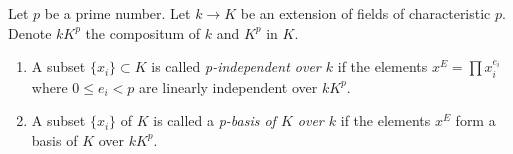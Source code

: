 \begin{definition}
\label{definition-p-basis}
Let $p$ be a prime number. Let $k \to K$ be an extension of fields
of characteristic $p$. Denote $kK^p$ the compositum of $k$ and $K^p$
in $K$.
\begin{enumerate}
\item A subset $\{x_i\} \subset K$ is called {\it p-independent
over $k$} if the elements $x^E = \prod x_i^{e_i}$ where
$0 \leq e_i < p$ are linearly independent over $kK^p$.
\item A subset $\{x_i\}$ of $K$ is called a
{\it p-basis of $K$ over $k$} if the elements
$x^E$ form a basis of $K$ over $kK^p$.
\end{enumerate}
\end{definition}
